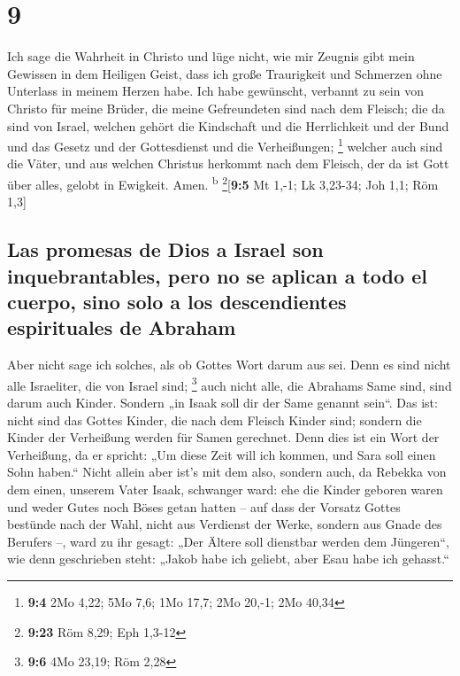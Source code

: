 \hypertarget{section-8}{%
\section{9}\label{section-8}}

 Ich sage die Wahrheit in Christo und lüge nicht, wie mir
Zeugnis gibt mein Gewissen in dem Heiligen Geist,  dass
ich große Traurigkeit und Schmerzen ohne Unterlass in meinem Herzen
habe.  Ich habe gewünscht, verbannt zu sein von Christo
für meine Brüder, die meine Gefreundeten sind nach dem Fleisch;
 die da sind von Israel, welchen gehört die Kindschaft und
die Herrlichkeit und der Bund und das Gesetz und der Gottesdienst und
die Verheißungen; \footnote{\textbf{9:4} 2Mo 4,22; 5Mo 7,6; 1Mo 17,7;
  2Mo 20,-1; 2Mo 40,34}  welcher auch sind die Väter, und
aus welchen Christus herkommt nach dem Fleisch, der da ist Gott über
alles, gelobt in Ewigkeit. Amen. \textsuperscript{b}
\footnote{\textbf{9:23} Röm 8,29; Eph 1,3-12}{[}\textbf{9:5} Mt 1,-1; Lk
3,23-34; Joh 1,1; Röm 1,3{]}

\hypertarget{las-promesas-de-dios-a-israel-son-inquebrantables-pero-no-se-aplican-a-todo-el-cuerpo-sino-solo-a-los-descendientes-espirituales-de-abraham}{%
\subsection{Las promesas de Dios a Israel son inquebrantables, pero no
se aplican a todo el cuerpo, sino solo a los descendientes espirituales
de
Abraham}\label{las-promesas-de-dios-a-israel-son-inquebrantables-pero-no-se-aplican-a-todo-el-cuerpo-sino-solo-a-los-descendientes-espirituales-de-abraham}}

 Aber nicht sage ich solches, als ob Gottes Wort darum aus
sei. Denn es sind nicht alle Israeliter, die von Israel sind;
\footnote{\textbf{9:6} 4Mo 23,19; Röm 2,28}  auch nicht
alle, die Abrahams Same sind, sind darum auch Kinder. Sondern „in Isaak
soll dir der Same genannt sein``.  Das ist: nicht sind das
Gottes Kinder, die nach dem Fleisch Kinder sind; sondern die Kinder der
Verheißung werden für Samen gerechnet.  Denn dies ist ein
Wort der Verheißung, da er spricht: „Um diese Zeit will ich kommen, und
Sara soll einen Sohn haben.``  Nicht allein aber ist's
mit dem also, sondern auch, da Rebekka von dem einen, unserem Vater
Isaak, schwanger ward:  ehe die Kinder geboren waren und
weder Gutes noch Böses getan hatten -- auf dass der Vorsatz Gottes
bestünde nach der Wahl,  nicht aus Verdienst der Werke,
sondern aus Gnade des Berufers --, ward zu ihr gesagt: „Der Ältere soll
dienstbar werden dem Jüngeren``,  wie denn geschrieben
steht: „Jakob habe ich geliebt, aber Esau habe ich gehasst.``


